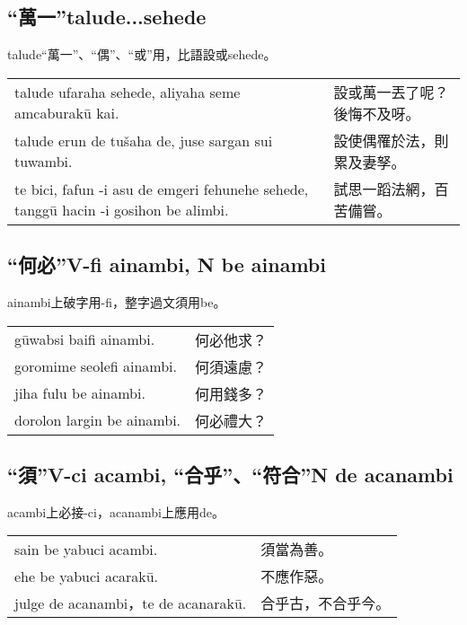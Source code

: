 \documentclass{article}
\begin{document}
\subsection{“萬一”talude...sehede}
\noindent talude“萬一”、“偶”、“或”用，比語設或sehede。
\begin{center}
    \begin{tabularx}{\textwidth}{XX}
        talude ufaraha sehede, aliyaha seme amcaburak\={u} kai. & 設或萬一丟了呢？後悔不及呀。\\
        talude erun de tu\v{s}aha de, juse sargan sui tuwambi. & 設使偶罹於法，則累及妻孥。\\
        te bici, fafun -i asu de emgeri fehunehe sehede, tangg\={u} hacin -i gosihon be alimbi. & 試思一蹈法網，百苦備嘗。
    \end{tabularx}
\end{center}

\subsection{“何必”V-fi ainambi, N be ainambi}
\noindent ainambi上破字用-fi，整字過文須用be。
\begin{center}
    \begin{tabularx}{\textwidth}{XX}
        g\={u}wabsi baifi ainambi. & 何必他求？\\
        goromime seolefi ainambi. &何須遠慮？\\
        jiha fulu be ainambi. &何用錢多？\\
        dorolon largin be ainambi. &何必禮大？
    \end{tabularx}
\end{center}


\subsection{“須”V-ci acambi, “合乎”、“符合”N de acanambi}
\noindent acambi上必接-ci，acanambi上應用de。
\begin{center}
    \begin{tabularx}{\textwidth}{XX}
        sain be yabuci acambi. &須當為善。\\
        ehe be yabuci acarak\={u}. & 不應作惡。\\
        julge de acanambi，te de acanarak\={u}. & 合乎古，不合乎今。
    \end{tabularx}
\end{center}
\end{document}
